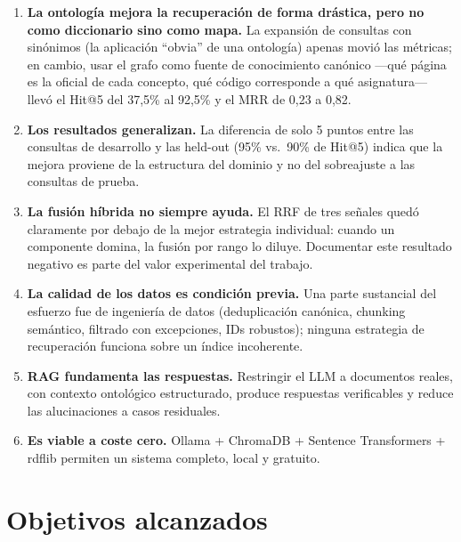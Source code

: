 \documentclass[12pt, a4paper, twoside]{report}
\begin{document}
\begin{enumerate}
  \item \textbf{La ontolog\'ia mejora la recuperaci\'on de forma dr\'astica, pero no como diccionario sino como mapa.} La expansi\'on de consultas con sin\'onimos (la aplicaci\'on ``obvia'' de una ontolog\'ia) apenas movi\'o las m\'etricas; en cambio, usar el grafo como fuente de conocimiento can\'onico ---qu\'e p\'agina es la oficial de cada concepto, qu\'e c\'odigo corresponde a qu\'e asignatura--- llev\'o el Hit@5 del 37,5\% al 92,5\% y el MRR de 0,23 a 0,82.
  \item \textbf{Los resultados generalizan.} La diferencia de solo 5 puntos entre las consultas de desarrollo y las held-out (95\% vs.\ 90\% de Hit@5) indica que la mejora proviene de la estructura del dominio y no del sobreajuste a las consultas de prueba.
  \item \textbf{La fusi\'on h\'ibrida no siempre ayuda.} El RRF de tres se\~nales qued\'o claramente por debajo de la mejor estrategia individual: cuando un componente domina, la fusi\'on por rango lo diluye. Documentar este resultado negativo es parte del valor experimental del trabajo.
  \item \textbf{La calidad de los datos es condici\'on previa.} Una parte sustancial del esfuerzo fue de ingenier\'ia de datos (deduplicaci\'on can\'onica, chunking sem\'antico, filtrado con excepciones, IDs robustos); ninguna estrategia de recuperaci\'on funciona sobre un \'indice incoherente.
  \item \textbf{RAG fundamenta las respuestas.} Restringir el LLM a documentos reales, con contexto ontol\'ogico estructurado, produce respuestas verificables y reduce las alucinaciones a casos residuales.
  \item \textbf{Es viable a coste cero.} Ollama + ChromaDB + Sentence Transformers + rdflib permiten un sistema completo, local y gratuito.
\end{enumerate}

\section{Objetivos alcanzados}
\end{document}
